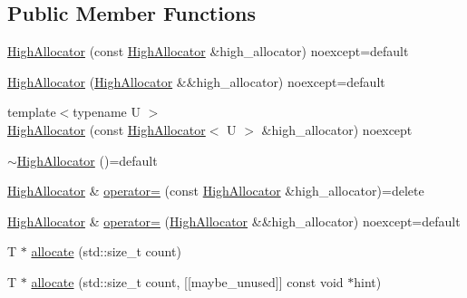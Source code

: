 \subsection*{Public Member Functions}
\begin{DoxyCompactItemize}
\item 
\mbox{\hyperlink{classmage_1_1_double_ended_memory_stack_1_1_high_allocator_ac1cb29fb8c7e53f90fd05d0c2feeb6a8}{High\+Allocator}} (const \mbox{\hyperlink{classmage_1_1_double_ended_memory_stack_1_1_high_allocator}{High\+Allocator}} \&high\+\_\+allocator) noexcept=default
\item 
\mbox{\hyperlink{classmage_1_1_double_ended_memory_stack_1_1_high_allocator_a4d7cf78e9d279f91bc2247a1dcbbccd6}{High\+Allocator}} (\mbox{\hyperlink{classmage_1_1_double_ended_memory_stack_1_1_high_allocator}{High\+Allocator}} \&\&high\+\_\+allocator) noexcept=default
\item 
{\footnotesize template$<$typename U $>$ }\\\mbox{\hyperlink{classmage_1_1_double_ended_memory_stack_1_1_high_allocator_a9283a193758a9a83adef3598c884af97}{High\+Allocator}} (const \mbox{\hyperlink{classmage_1_1_double_ended_memory_stack_1_1_high_allocator}{High\+Allocator}}$<$ U $>$ \&high\+\_\+allocator) noexcept
\item 
\mbox{\hyperlink{classmage_1_1_double_ended_memory_stack_1_1_high_allocator_a2a27e1ab0cad95cf83e63b8c7d2cb102}{$\sim$\+High\+Allocator}} ()=default
\item 
\mbox{\hyperlink{classmage_1_1_double_ended_memory_stack_1_1_high_allocator}{High\+Allocator}} \& \mbox{\hyperlink{classmage_1_1_double_ended_memory_stack_1_1_high_allocator_acf31dee2d290adef5221cc3b012ce902}{operator=}} (const \mbox{\hyperlink{classmage_1_1_double_ended_memory_stack_1_1_high_allocator}{High\+Allocator}} \&high\+\_\+allocator)=delete
\item 
\mbox{\hyperlink{classmage_1_1_double_ended_memory_stack_1_1_high_allocator}{High\+Allocator}} \& \mbox{\hyperlink{classmage_1_1_double_ended_memory_stack_1_1_high_allocator_af9a43783cbf9d7dbce2aa8ae73c7d87b}{operator=}} (\mbox{\hyperlink{classmage_1_1_double_ended_memory_stack_1_1_high_allocator}{High\+Allocator}} \&\&high\+\_\+allocator) noexcept=default
\item 
T $\ast$ \mbox{\hyperlink{classmage_1_1_double_ended_memory_stack_1_1_high_allocator_aa5ba9b8d577ead288cbb27a7ab3560bd}{allocate}} (std\+::size\+\_\+t count)
\item 
T $\ast$ \mbox{\hyperlink{classmage_1_1_double_ended_memory_stack_1_1_high_allocator_a97edefeacbf89d713ef1b85adc37a25d}{allocate}} (std\+::size\+\_\+t count, \mbox{[}\mbox{[}maybe\+\_\+unused\mbox{]}\mbox{]} const void $\ast$hint)

\end{DoxyCompactItemize}
